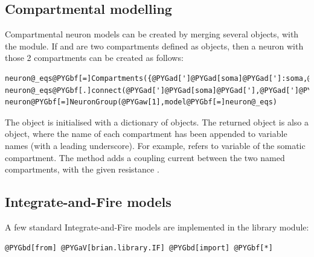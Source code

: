 \documentclass[letterpaper,10pt,english]{manual}
\begin{document}
\subsection{Compartmental modelling}

Compartmental neuron models can be created by merging several  objects,
with the  module. If  and  are two compartments defined as
 objects, then a neuron with those 2 compartments can be created as follows:

\begin{Verbatim}[commandchars=@\[\]]
neuron@_eqs@PYGbf[=]Compartments({@PYGad[']@PYGad[soma]@PYGad[']:soma,@PYGad[']@PYGad[dendrite]@PYGad[']:dendrite})
neuron@_eqs@PYGbf[.]connect(@PYGad[']@PYGad[soma]@PYGad['],@PYGad[']@PYGad[dendrite]@PYGad['],Ra)
neuron@PYGbf[=]NeuronGroup(@PYGaw[1],model@PYGbf[=]neuron@_eqs)
\end{Verbatim}

The  object is initialised with a dictionary of  objects.
The returned object  is also a  object, where the name of
each compartment has been appended to variable names (with a leading underscore).
For example,  refers to variable  of the somatic compartment.
The  method adds a coupling current between the two named compartments, with the given
resistance .


\subsection{Integrate-and-Fire models}

A few standard Integrate-and-Fire models are implemented in the  library module:

\begin{Verbatim}[commandchars=@\[\]]
@PYGbd[from] @PYGaV[brian.library.IF] @PYGbd[import] @PYGbf[*]
\end{Verbatim}
\end{document}

